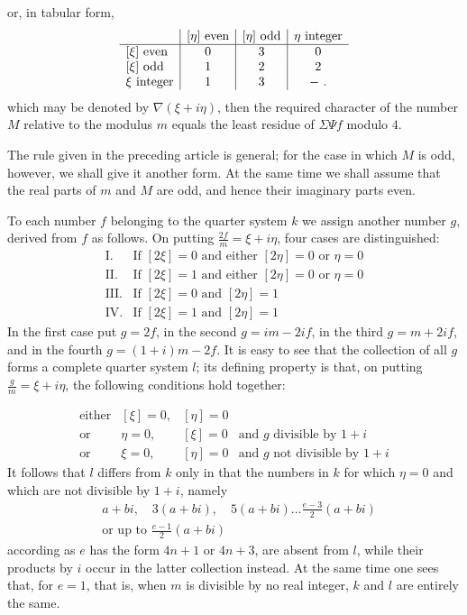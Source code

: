 or, in tabular form,
\[
\begin{array}{l|c|c|c}
&[\eta]\text{ even}&[\eta]\text{ odd}&\eta\text{ integer}\\\hline
[\xi]\text{ even}&0&3&0\\
\relax[\xi]\text{ odd}&1&2&2\\
\xi\text{ integer}&1&3&-\ \mathbin{.}
\end{array}
\]
which may be denoted by $\nabla(\xi+i\eta)$, then the required character of the number $M$ relative to the modulus $m$ equals the least residue of $\Sigma\Psi f$ modulo $4$.


The rule given in the preceding article is general; for the case in which $M$ is odd, however, we shall give it another form. At the same time we shall assume that the real parts of $m$ and $M$ are odd, and hence their imaginary parts even.

To each number $f$ belonging to the quarter system $k$ we assign another number $g$, derived from $f$ as follows. On putting $\frac{2f}{m}=\xi+i\eta$, four cases are distinguished:
\[
\begin{array}{ll}
\mathrm{I.}&\text{If }[2\xi]=0\text{ and either }[2\eta]=0\text{ or }\eta=0\\
\mathrm{II.}&\text{If }[2\xi]=1\text{ and either }[2\eta]=0\text{ or }\eta=0\\
\mathrm{III.}&\text{If }[2\xi]=0\text{ and }[2\eta]=1\\
\mathrm{IV.}&\text{If }[2\xi]=1\text{ and }[2\eta]=1
\end{array}
\]
In the first case put $g=2f$, in the second $g=im-2if$, in the third $g=m+2if$, and in the fourth $g=(1+i)m-2f$. It is easy to see that the collection of all $g$ forms a complete quarter system $l$; its defining property is that, on putting $\frac gm=\xi+i\eta$, the following conditions hold together:

\[
\begin{array}{llll}
\text{either}&[\xi]=0,&[\eta]=0&\\
\text{or}&\eta=0,&[\xi]=0&\text{and }g\text{ divisible by }1+i\\
\text{or}&\xi=0,&[\eta]=0&\text{and }g\text{ not divisible by }1+i
\end{array}
\]
It follows that $l$ differs from $k$ only in that the numbers in $k$ for which $\eta=0$ and which are not divisible by $1+i$, namely
\[
\begin{aligned}
&a+bi,\quad3(a+bi),\quad5(a+bi)\ldots\frac{e-3}{2}(a+bi)\\
&\text{or up to }\frac{e-1}{2}(a+bi)
\end{aligned}
\]
according as $e$ has the form $4n+1$ or $4n+3$, are absent from $l$, while their products by $i$ occur in the latter collection instead. At the same time one sees that, for $e=1$, that is, when $m$ is divisible by no real integer, $k$ and $l$ are entirely the same.

